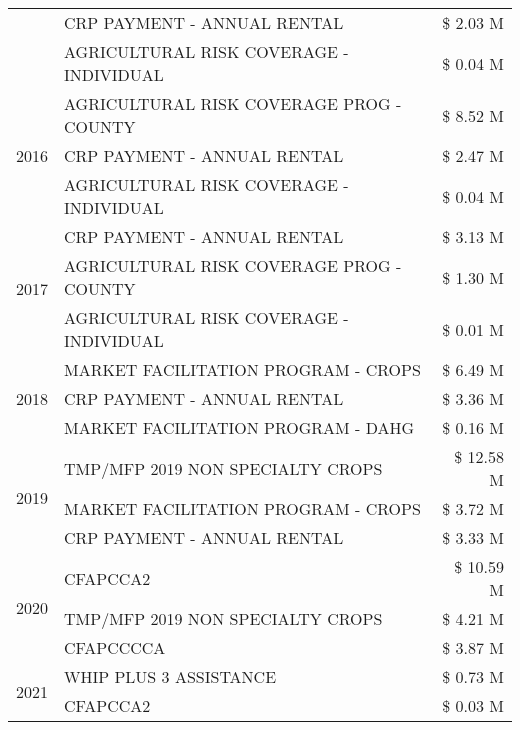 \begin{tabular}{llr}
 & CRP PAYMENT - ANNUAL RENTAL & \$ 2.03 M \\
 & AGRICULTURAL RISK COVERAGE - INDIVIDUAL & \$ 0.04 M \\
\cline{1-3}
\multirow[t]{3}{*}{2016} & AGRICULTURAL RISK COVERAGE PROG - COUNTY & \$ 8.52 M \\
 & CRP PAYMENT - ANNUAL RENTAL & \$ 2.47 M \\
 & AGRICULTURAL RISK COVERAGE - INDIVIDUAL & \$ 0.04 M \\
\cline{1-3}
\multirow[t]{3}{*}{2017} & CRP PAYMENT - ANNUAL RENTAL & \$ 3.13 M \\
 & AGRICULTURAL RISK COVERAGE PROG - COUNTY & \$ 1.30 M \\
 & AGRICULTURAL RISK COVERAGE - INDIVIDUAL & \$ 0.01 M \\
\cline{1-3}
\multirow[t]{3}{*}{2018} & MARKET FACILITATION PROGRAM - CROPS & \$ 6.49 M \\
 & CRP PAYMENT - ANNUAL RENTAL & \$ 3.36 M \\
 & MARKET FACILITATION PROGRAM - DAHG & \$ 0.16 M \\
\cline{1-3}
\multirow[t]{3}{*}{2019} & TMP/MFP 2019 NON SPECIALTY CROPS & \$ 12.58 M \\
 & MARKET FACILITATION PROGRAM - CROPS & \$ 3.72 M \\
 & CRP PAYMENT - ANNUAL RENTAL & \$ 3.33 M \\
\cline{1-3}
\multirow[t]{3}{*}{2020} & CFAPCCA2 & \$ 10.59 M \\
 & TMP/MFP 2019 NON SPECIALTY CROPS & \$ 4.21 M \\
 & CFAPCCCCA & \$ 3.87 M \\
\cline{1-3}
\multirow[t]{2}{*}{2021} & WHIP PLUS 3 ASSISTANCE & \$ 0.73 M \\
 & CFAPCCA2 & \$ 0.03 M \\
\cline{1-3}
\bottomrule
\end{tabular}
